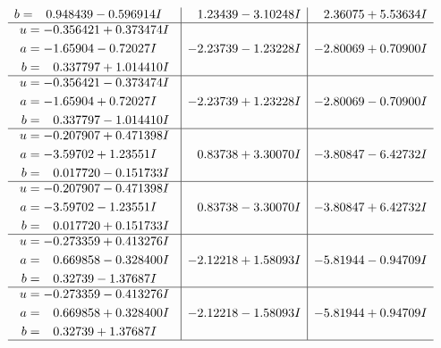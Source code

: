 \documentclass[1p]{elsarticle_modified}
\theoremstyle{definition}
\begin{document}
$$\begin{array}{c|c|c}
\begin{aligned}
b &= \phantom{-}0.948439 - 0.596914 I\end{aligned}
 & \phantom{-}1.23439 - 3.10248 I & \phantom{-}2.36075 + 5.53634 I \\ \hline\begin{aligned}
u &= -0.356421 + 0.373474 I \\
a &= -1.65904 - 0.72027 I \\
b &= \phantom{-}0.337797 + 1.014410 I\end{aligned}
 & -2.23739 - 1.23228 I & -2.80069 + 0.70900 I \\ \hline\begin{aligned}
u &= -0.356421 - 0.373474 I \\
a &= -1.65904 + 0.72027 I \\
b &= \phantom{-}0.337797 - 1.014410 I\end{aligned}
 & -2.23739 + 1.23228 I & -2.80069 - 0.70900 I \\ \hline\begin{aligned}
u &= -0.207907 + 0.471398 I \\
a &= -3.59702 + 1.23551 I \\
b &= \phantom{-}0.017720 - 0.151733 I\end{aligned}
 & \phantom{-}0.83738 + 3.30070 I & -3.80847 - 6.42732 I \\ \hline\begin{aligned}
u &= -0.207907 - 0.471398 I \\
a &= -3.59702 - 1.23551 I \\
b &= \phantom{-}0.017720 + 0.151733 I\end{aligned}
 & \phantom{-}0.83738 - 3.30070 I & -3.80847 + 6.42732 I \\ \hline\begin{aligned}
u &= -0.273359 + 0.413276 I \\
a &= \phantom{-}0.669858 - 0.328400 I \\
b &= \phantom{-}0.32739 - 1.37687 I\end{aligned}
 & -2.12218 + 1.58093 I & -5.81944 - 0.94709 I \\ \hline\begin{aligned}
u &= -0.273359 - 0.413276 I \\
a &= \phantom{-}0.669858 + 0.328400 I \\
b &= \phantom{-}0.32739 + 1.37687 I\end{aligned}
 & -2.12218 - 1.58093 I & -5.81944 + 0.94709 I\\
 \hline 
 \end{array}$$\newpage\newpage\renewcommand{\arraystretch}{1}
\end{document}
